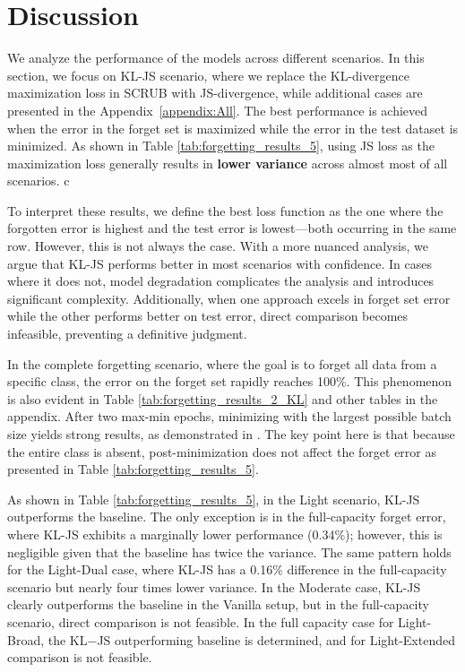 \documentclass{article} %
\begin{document}
\section{Discussion} \label{err}
\vspace{-0.1in}
We analyze the performance of the models across different scenarios. In this section, we focus on KL-JS scenario, where we replace the KL-divergence maximization loss in SCRUB with JS-divergence, while additional cases are presented in the Appendix~\ref{appendix:All}. The best performance is achieved when the error in the forget set is maximized while the error in the test dataset is minimized. As shown in Table \ref{tab:forgetting_results_5}, using JS loss as the maximization loss generally results in \textbf{lower variance} across almost most of all scenarios.
c

To interpret these results, we define the best loss function as the one where the forgotten error is highest and the test error is lowest—both occurring in the same row. However, this is not always the case. With a more nuanced analysis, we argue that KL-JS performs better in most scenarios with confidence. In cases where it does not, model degradation complicates the analysis and introduces significant complexity. Additionally, when one approach excels in forget set error while the other performs better on test error, direct comparison becomes infeasible, preventing a definitive judgment.

In the complete forgetting scenario, where the goal is to forget all data from a specific class, the error on the forget set rapidly reaches 100\%. This phenomenon is also evident in Table \ref{tab:forgetting_results_2_KL} and other tables in the appendix. After two max-min epochs, minimizing with the largest possible batch size yields strong results, as demonstrated in \cite{kurmanji2023unboundedmachineunlearning}. The key point here is that because the entire class is absent, post-minimization does not affect the forget error as presented in Table \ref{tab:forgetting_results_5}.

As shown in Table \ref{tab:forgetting_results_5}, in the Light scenario, KL-JS outperforms the baseline. The only exception is in the full-capacity forget error, where KL-JS exhibits a marginally lower performance (0.34\%); however, this is negligible given that the baseline has twice the variance. The same pattern holds for the Light-Dual case, where KL-JS has a 0.16\% difference in the full-capacity scenario but nearly four times lower variance. In the Moderate case, KL-JS clearly outperforms the baseline in the Vanilla setup, but in the full-capacity scenario, direct comparison is not feasible. In the full capacity case for Light-Broad, the KL$-$JS outperforming baseline is determined, and for Light-Extended comparison is not feasible.
\end{document}
